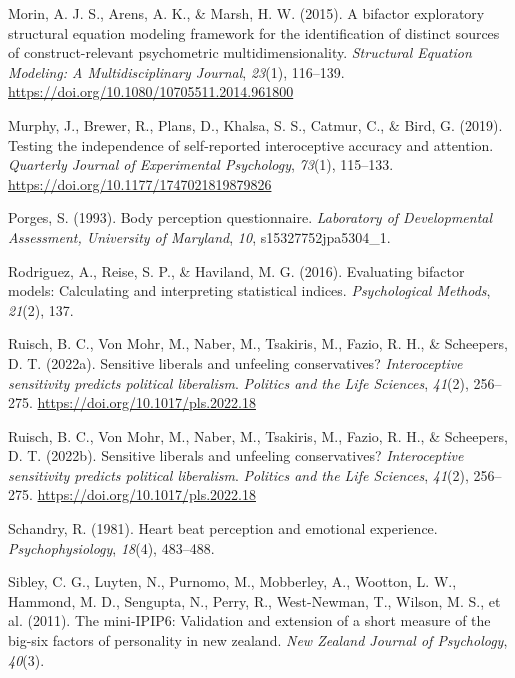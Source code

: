 \documentclass[
  man,
  floatsintext,
  longtable,
  nolmodern,
  notxfonts,
  notimes,
  colorlinks=true,linkcolor=blue,citecolor=blue,urlcolor=blue]{apa7}
\newlength{\cslhangindent}
\newenvironment{CSLReferences}[2] %
 {\begin{list}{}{%
  \setlength{\itemindent}{0pt}
  \setlength{\leftmargin}{0pt}
  \setlength{\parsep}{0pt}
  \ifodd #1
   \setlength{\leftmargin}{\cslhangindent}
   \setlength{\itemindent}{-1\cslhangindent}
  \fi
  \setlength{\itemsep}{#2\baselineskip}}}
 {\end{list}}
\begin{document}
\begin{CSLReferences}{1}{0}
Morin, A. J. S., Arens, A. K., \& Marsh, H. W. (2015). A bifactor
exploratory structural equation modeling framework for the
identification of distinct sources of construct-relevant psychometric
multidimensionality. \emph{Structural Equation Modeling: A
Multidisciplinary Journal}, \emph{23}(1), 116--139.
\url{https://doi.org/10.1080/10705511.2014.961800}

Murphy, J., Brewer, R., Plans, D., Khalsa, S. S., Catmur, C., \& Bird,
G. (2019). Testing the independence of self-reported interoceptive
accuracy and attention. \emph{Quarterly Journal of Experimental
Psychology}, \emph{73}(1), 115--133.
\url{https://doi.org/10.1177/1747021819879826}

Porges, S. (1993). Body perception questionnaire. \emph{Laboratory of
Developmental Assessment, University of Maryland}, \emph{10},
s15327752jpa5304\_1.

Rodriguez, A., Reise, S. P., \& Haviland, M. G. (2016). Evaluating
bifactor models: Calculating and interpreting statistical indices.
\emph{Psychological Methods}, \emph{21}(2), 137.

Ruisch, B. C., Von Mohr, M., Naber, M., Tsakiris, M., Fazio, R. H., \&
Scheepers, D. T. (2022a). Sensitive liberals and unfeeling
conservatives? {\emph{Interoceptive sensitivity predicts political
liberalism}}. \emph{Politics and the Life Sciences}, \emph{41}(2),
256--275. \url{https://doi.org/10.1017/pls.2022.18}

Ruisch, B. C., Von Mohr, M., Naber, M., Tsakiris, M., Fazio, R. H., \&
Scheepers, D. T. (2022b). Sensitive liberals and unfeeling
conservatives? {\emph{Interoceptive sensitivity predicts political
liberalism}}. \emph{Politics and the Life Sciences}, \emph{41}(2),
256--275. \url{https://doi.org/10.1017/pls.2022.18}

Schandry, R. (1981). Heart beat perception and emotional experience.
\emph{Psychophysiology}, \emph{18}(4), 483--488.

Sibley, C. G., Luyten, N., Purnomo, M., Mobberley, A., Wootton, L. W.,
Hammond, M. D., Sengupta, N., Perry, R., West-Newman, T., Wilson, M. S.,
et al. (2011). The mini-IPIP6: Validation and extension of a short
measure of the big-six factors of personality in new zealand. \emph{New
Zealand Journal of Psychology}, \emph{40}(3).


\end{CSLReferences}
\end{document}
